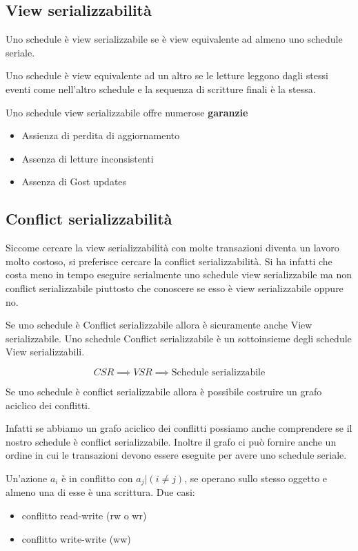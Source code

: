 \subsection{View serializzabilità}

Uno schedule è view serializzabile se è view equivalente ad almeno uno schedule seriale.

Uno schedule è view equivalente ad un altro se le letture leggono dagli stessi eventi come nell'altro schedule e la sequenza di scritture finali è la stessa.

Uno schedule view serializzabile offre numerose \textbf{garanzie}
\begin{itemize}
    \item Assienza di perdita di aggiornamento
    \item Assenza di letture inconsistenti
    \item Assenza di Gost updates
\end{itemize}

\subsection{Conflict serializzabilità}

Siccome cercare la view serializzabilità con molte transazioni diventa un lavoro molto costoso, si preferisce cercare la conflict serializzabilità. Si ha infatti che costa meno in tempo eseguire serialmente uno schedule view serializzabile ma non conflict serializzabile piuttosto che conoscere se esso è view serializzabile oppure no.

Se uno schedule è Conflict serializzabile allora è sicuramente anche View serializzabile. Uno schedule Conflict serializzabile è un sottoinsieme degli schedule View serializzabili.

\[CSR \implies VSR \implies \text{Schedule serializzabile}\]

Se uno schedule è conflict serializzabile allora è possibile costruire un grafo aciclico dei conflitti.

Infatti se abbiamo un grafo aciclico dei conflitti possiamo anche comprendere se il nostro schedule è conflict serializzabile. Inoltre il grafo ci può fornire anche un ordine in cui le transazioni devono essere eseguite per avere uno schedule seriale.

Un'azione $a_i$ è in conflitto con $a_j | (i \neq j)$, se operano sullo stesso
oggetto e almeno una di esse è una scrittura. Due casi:
\begin{itemize}
    \item conflitto read-write (rw o wr)
    \item conflitto write-write (ww)
\end{itemize}

